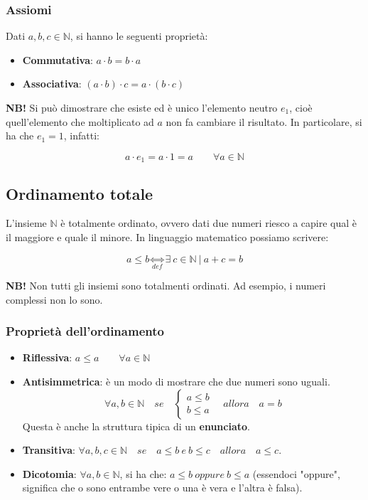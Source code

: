\documentclass{article}
\begin{document}
\subsubsection{Assiomi}
Dati $a, b, c \in \mathbb{N}$, si hanno le seguenti proprietà: 

\begin{itemize}
    \item \textbf{Commutativa}: $a \cdot b = b \cdot a$
    \item \textbf{Associativa}: $(a \cdot b) \cdot c = a \cdot (b \cdot c)$
\end{itemize}

\noindent\textbf{NB!} Si può dimostrare che esiste ed è unico l'elemento neutro $e_1$, cioè quell'elemento che moltiplicato ad $a$ non fa cambiare il risultato. In particolare, si ha che $e_1 = 1$, infatti:

\begin{equation*}
    a \cdot e_1 = a \cdot 1 = a \qquad \forall a \in \mathbb{N}
\end{equation*}

\subsection{Ordinamento totale}
L'insieme $\mathbb{N}$ è totalmente ordinato, ovvero dati due numeri riesco a capire qual è il maggiore e quale il minore. In linguaggio matematico possiamo scrivere: 

\begin{equation*}
    a \leq b \underset{def}{\Longleftrightarrow} \exists \ c \in \mathbb{N} \ | \ a + c = b
\end{equation*}

\noindent\textbf{NB!} Non tutti gli insiemi sono totalmenti ordinati. Ad esempio, i numeri complessi non lo sono.

\subsubsection{Proprietà dell'ordinamento}
\begin{itemize}
    \item \textbf{Riflessiva}: $a \leq a \qquad \forall a \in \mathbb{N}$
    \item \textbf{Antisimmetrica}: è un modo di mostrare che due numeri sono uguali. $$\forall a,b \in \mathbb{N} \quad se \quad \begin{cases}
        a \leq b \\ 
        b \leq a
    \end{cases} \quad allora \quad a = b$$ \noindent Questa è anche la struttura tipica di un \textbf{enunciato}.
    
    \item \textbf{Transitiva}: $\forall a, b, c \in \mathbb{N} \quad se \quad a \leq b \ e \ b \leq c \quad allora \quad a \leq c$.
    \item \textbf{Dicotomia}: $\forall a,b \in \mathbb{N}$, si ha che: $a \leq b \ oppure \ b \leq a$ (essendoci "oppure", significa che o sono entrambe vere o una è vera e l'altra è falsa).
\end{itemize}
\end{document}
